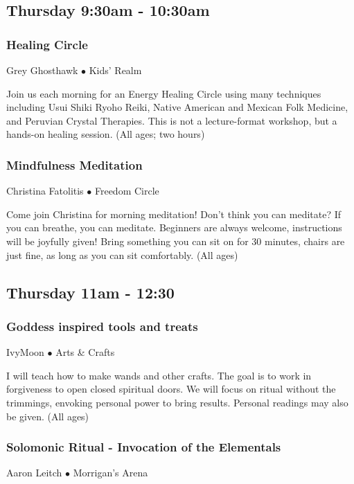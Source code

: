 

\subsection{Thursday 9:30am - 10:30am}

\subsubsection{Healing Circle}
\label{Thu-Healing1}
{\small Grey Ghosthawk $\bullet$  Kids' Realm}

 Join us each morning for an Energy Healing Circle using many techniques including Usui Shiki Ryoho Reiki, Native American and Mexican Folk Medicine, and Peruvian Crystal Therapies. This is not a lecture-format workshop, but a hands-on healing session.  {\small (All ages; two hours)}

\subsubsection{Mindfulness Meditation}
\label{Thu-Fatolitis1}
{\small Christina Fatolitis $\bullet$  Freedom Circle}

 Come join Christina for morning meditation! Don't think you can meditate? If you can breathe, you can meditate. Beginners are always welcome, instructions will be joyfully given! Bring something you can sit on for 30 minutes, chairs are just fine, as long as you can sit comfortably. {\small (All ages)}

\subsection{Thursday 11am - 12:30}

\subsubsection{Goddess inspired tools and treats}
\label{Thu-Ivy1}
{\small IvyMoon $\bullet$  Arts \& Crafts}

 I will teach how to make wands and other crafts. The goal is to work in forgiveness to open closed spiritual doors. We will focus on ritual without the trimmings, envoking personal power to bring results. Personal readings may also be given.  {\small (All ages)}

\subsubsection{Solomonic Ritual - Invocation of the Elementals}
\label{Thu-Leitch1}
{\small Aaron Leitch $\bullet$  Morrigan's Arena}

